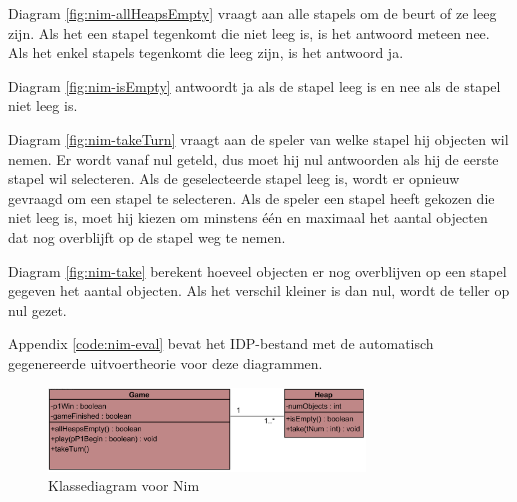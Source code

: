 Diagram \ref{fig:nim-allHeapsEmpty} vraagt aan alle stapels om de beurt of ze leeg zijn. Als het een stapel tegenkomt die niet leeg is, is het antwoord meteen nee. Als het enkel stapels tegenkomt die leeg zijn, is het antwoord ja.

Diagram \ref{fig:nim-isEmpty} antwoordt ja als de stapel leeg is en nee als de stapel niet leeg is.

Diagram \ref{fig:nim-takeTurn} vraagt aan de speler van welke stapel hij objecten wil nemen. Er wordt vanaf nul geteld, dus moet hij nul antwoorden als hij de eerste stapel wil selecteren. Als de geselecteerde stapel leeg is, wordt er opnieuw gevraagd om een stapel te selecteren. Als de speler een stapel heeft gekozen die niet leeg is, moet hij kiezen om minstens \'e\'en en maximaal het aantal objecten dat nog overblijft op de stapel weg te nemen.

Diagram \ref{fig:nim-take} berekent hoeveel objecten er nog overblijven op een stapel gegeven het aantal objecten. Als het verschil kleiner is dan nul, wordt de teller op nul gezet.

Appendix \ref{code:nim-eval} bevat het IDP-bestand met de automatisch gegenereerde uitvoertheorie voor deze diagrammen.

\begin{figure}[h]
	\centering
	\includegraphics[width=0.75\textwidth]{chap-evaluatie/ClassDiagram1.png}
	\caption{Klassediagram voor Nim}
	\label{fig:nim-cd}
\end{figure}

